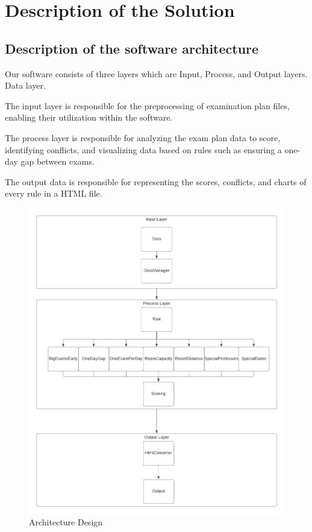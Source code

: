 
\section{Description of the Solution}
\subsection{Description of the software architecture}



Our software consists of three layers which are Input, Process, and Output layers. Data layer.

\vspace{\baselineskip}

The input layer is responsible for the preprocessing of examination plan files, enabling their utilization within the software.

\vspace{\baselineskip}

The process layer is responsible for analyzing the exam plan data to score, identifying conflicts, and visualizing data based on rules such as ensuring a one-day gap between exams.


\vspace{\baselineskip}

The output data is responsible for representing the scores, conflicts, and charts of every rule in a HTML file.

\FloatBarrier
\begin{figure}[ht]
    \centering
    \includegraphics[width=160mm]{images/architecture.png}
    \caption{Architecture Design}
    \label{fig:entrance-screen}
\end{figure}
\FloatBarrier




